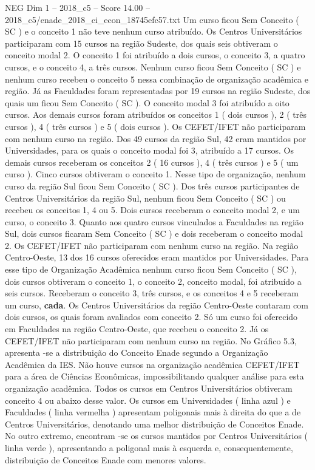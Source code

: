 \begin{textsample}{NEG Dim 1 – 2018\_c5 – Score 14.00 – 2018\_c5/enade\_2018\_ci\_econ\_18745efc57.txt}
Um curso ficou Sem Conceito ( SC ) e o conceito 1 não teve nenhum curso atribuído.
Os Centros Universitários participaram com 15 cursos na região Sudeste, dos quais seis obtiveram o conceito modal 2.
O conceito 1 foi atribuído a dois cursos, o conceito 3, a quatro cursos, e o conceito 4, a três cursos.
Nenhum curso ficou Sem Conceito ( SC ) e nenhum curso recebeu o conceito 5 nessa combinação de organização acadêmica e região.
Já as Faculdades foram representadas por 19 cursos na região Sudeste, dos quais um ficou Sem Conceito ( SC ).
O conceito modal 3 foi atribuído a oito cursos.
Aos demais cursos foram atribuídos os conceitos 1 ( dois cursos ), 2 ( três cursos ), 4 ( três cursos ) e 5 ( dois cursos ).
Os CEFET/IFET não participaram com nenhum curso na região.
Dos 49 cursos da região Sul, 42 eram mantidos por Universidades, para os quais o conceito modal foi 3, atribuído a 17 cursos.
Os demais cursos receberam os conceitos 2 ( 16 cursos ), 4 ( três cursos ) e 5 ( um curso ).
Cinco cursos obtiveram o conceito 1.
Nesse tipo de organização, nenhum curso da região Sul ficou Sem Conceito ( SC ).
Dos três cursos participantes de Centros Universitários da região Sul, nenhum ficou Sem Conceito ( SC ) ou recebeu os conceitos 1, 4 ou 5.
Dois cursos receberam o conceito modal 2, e um curso, o conceito 3.
Quanto aos quatro cursos vinculados a Faculdades na região Sul, dois cursos ficaram Sem Conceito ( SC ) e dois receberam o conceito modal 2.
Os CEFET/IFET não participaram com nenhum curso na região.
Na região Centro-Oeste, 13 dos 16 cursos oferecidos eram mantidos por Universidades.
Para esse tipo de Organização Acadêmica nenhum curso ficou Sem Conceito ( SC ), dois cursos obtiveram o conceito 1, o conceito 2, conceito modal, foi atribuído a seis cursos.
Receberam o conceito 3, três cursos, e os conceitos 4 e 5 receberam um curso, \textbf{cada}.
Os Centros Universitários da região Centro-Oeste contaram com dois cursos, os quais foram avaliados com conceito 2.
Só um curso foi oferecido em Faculdades na região Centro-Oeste, que recebeu o conceito 2.
Já os CEFET/IFET não participaram com nenhum curso na região.
No Gráfico 5.3, apresenta -se a distribuição do Conceito Enade segundo a Organização Acadêmica da IES.
Não houve cursos na organização acadêmica CEFET/IFET para a área de Ciências Econômicas, impossibilitando qualquer análise para esta organização acadêmica.
Todos os cursos em Centros Universitários obtiveram conceito 4 ou abaixo desse valor.
Os cursos em Universidades ( linha azul ) e Faculdades ( linha vermelha ) apresentam poligonais mais à direita do que a de Centros Universitários, denotando uma melhor distribuição de Conceitos Enade.
No outro extremo, encontram -se os cursos mantidos por Centros Universitários ( linha verde ), apresentando a poligonal mais à esquerda e, consequentemente, distribuição de Conceitos Enade com menores valores.

\end{textsample}

